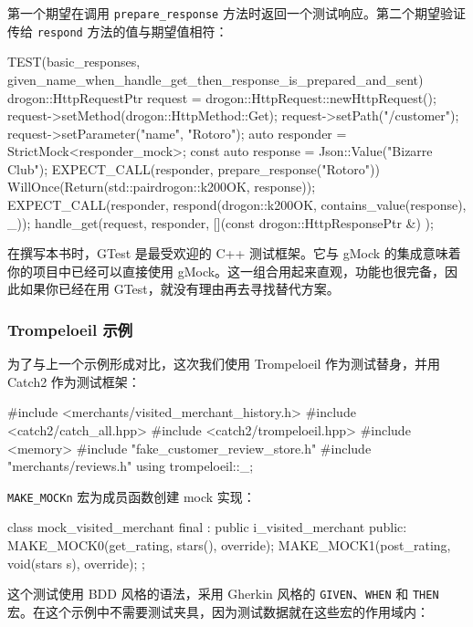 \label{idx:854}
第一个期望在调用 \texttt{prepare\_\allowbreak{}response} 方法时返回一个测试响应。第二个期望验证传给 \texttt{respond} 方法的值与期望值相符：

\begin{codebox}[cpp]
TEST(basic_responses,
     given_name_when_handle_get_then_response_is_prepared_and_sent) {
  drogon::HttpRequestPtr request = drogon::HttpRequest::newHttpRequest();
  request->setMethod(drogon::HttpMethod::Get);
  request->setPath("/customer");
  request->setParameter("name", "Rotoro");
  auto responder = StrictMock<responder_mock>{};
  const auto response = Json::Value("Bizarre Club");
  EXPECT_CALL(responder, prepare_response("Rotoro"))
  WillOnce(Return(std::pair{drogon::k200OK, response}));
  EXPECT_CALL(responder, respond(drogon::k200OK, contains_value(response), _));
  handle_get(request, responder, [](const drogon::HttpResponsePtr &) {});
}
\end{codebox}

在撰写本书时，GTest 是最受欢迎的 C++ 测试框架。它与 gMock 的集成意味着你的项目中已经可以直接使用 gMock。这一组合用起来直观，功能也很完备，因此如果你已经在用 GTest，就没有理由再去寻找替代方案。

\subsubsection{Trompeloeil 示例}

\label{idx:855}
\label{idx:856}
为了与上一个示例形成对比，这次我们使用 Trompeloeil 作为测试替身，并用 Catch2 作为测试框架：

\begin{codebox}[cpp]
#include <merchants/visited_merchant_history.h>
#include <catch2/catch_all.hpp>
#include <catch2/trompeloeil.hpp>
#include <memory>
#include "fake_customer_review_store.h"
#include "merchants/reviews.h"
using trompeloeil::_;
\end{codebox}

\label{idx:857}
\texttt{MAKE\_\allowbreak{}MOCKn} 宏为成员函数创建 mock 实现：

\begin{codebox}[cpp]
class mock_visited_merchant final : public i_visited_merchant {
public:
  MAKE_MOCK0(get_rating, stars(), override);
  MAKE_MOCK1(post_rating, void(stars s), override);
};
\end{codebox}

\label{idx:858}
这个测试使用 BDD 风格的语法，采用 Gherkin 风格的 \texttt{GIVEN}、\texttt{WHEN} 和 \texttt{THEN} 宏。在这个示例中不需要测试夹具，因为测试数据就在这些宏的作用域内：


